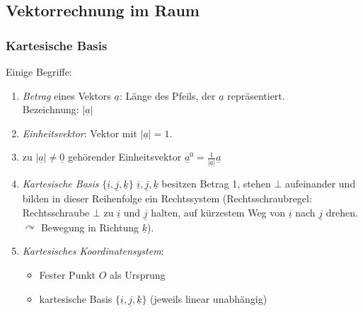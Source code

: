 \subsection{Vektorrechnung im Raum} \label{sec:5.5}
\subsubsection{Kartesische Basis}
Einige Begriffe:
\begin{enumerate}
\item \emph{Betrag} eines Vektors $\underline{a}$: Länge des Pfeils, der $\underline{a}$ repräsentiert.\\
Bezeichnung: $|\underline{a}|$
\item \emph{Einheitsvektor}: Vektor mit $|\underline{a}|=1$.
\item zu $|\underline{a}|\not =\underline{0}$ gehörender Einheitsvektor $\boxed{\underline{a}^0=\frac{1}{|\underline{a}|}\underline{a}}$
\item \emph{Kartesische Basis} $\{\underline{i}, \underline{j}, \underline{k}\}$ $\underline{i}, \underline{j}, \underline{k}$ besitzen Betrag 1, stehen $\bot$ aufeinander und bilden in dieser Reihenfolge ein Rechtssystem (Rechtsschraubregel: Rechtsschraube $\bot$ zu $\underline{i}$ und $\underline{j}$ halten, auf kürzestem Weg von $\underline{i}$ nach $\underline{j}$ drehen. $\curvearrowright$ Bewegung in Richtung $\underline{k}$).\\
\item \emph{Kartesisches Koordinatensystem}: 
\begin{itemize}
\item Fester Punkt $O$ als Ursprung
\item kartesische Basis $\{\underline{i}, \underline{j}, \underline{k}\}$ (jeweils linear unabhängig)
\end{itemize}
\end{enumerate}
